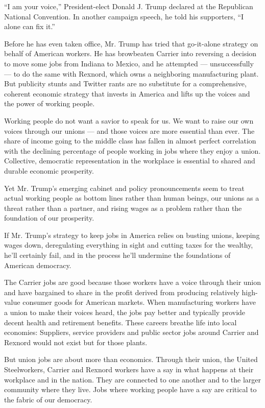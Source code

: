 ``I am your voice,'' President-elect Donald J. Trump declared at the
Republican National Convention. In another campaign speech, he told his
supporters, ``I alone can fix it.''

Before he has even taken office, Mr. Trump has tried that go-it-alone
strategy on behalf of American workers. He has browbeaten Carrier into
reversing a decision to move some jobs from Indiana to Mexico, and he
attempted --- unsuccessfully --- to do the same with Rexnord, which owns
a neighboring manufacturing plant. But publicity stunts and Twitter
rants are no substitute for a comprehensive, coherent economic strategy
that invests in America and lifts up the voices and the power of working
people.

Working people do not want a savior to speak for us. We want to raise
our own voices through our unions --- and those voices are more
essential than ever. The share of income going to the middle class has
fallen in almost perfect correlation with the declining percentage of
people working in jobs where they enjoy a union. Collective, democratic
representation in the workplace is essential to shared and durable
economic prosperity.

Yet Mr. Trump's emerging cabinet and policy pronouncements seem to treat
actual working people as bottom lines rather than human beings, our
unions as a threat rather than a partner, and rising wages as a problem
rather than the foundation of our prosperity.

If Mr. Trump's strategy to keep jobs in America relies on busting
unions, keeping wages down, deregulating everything in sight and cutting
taxes for the wealthy, he'll certainly fail, and in the process he'll
undermine the foundations of American democracy.

The Carrier jobs are good because those workers have a voice through
their union and have bargained to share in the profit derived from
producing relatively high-value consumer goods for American markets.
When manufacturing workers have a union to make their voices heard, the
jobs pay better and typically provide decent health and retirement
benefits. These careers breathe life into local economies: Suppliers,
service providers and public sector jobs around Carrier and Rexnord
would not exist but for those plants.

But union jobs are about more than economics. Through their union, the
United Steelworkers, Carrier and Rexnord workers have a say in what
happens at their workplace and in the nation. They are connected to one
another and to the larger community where they live. Jobs where working
people have a say are critical to the fabric of our democracy.

